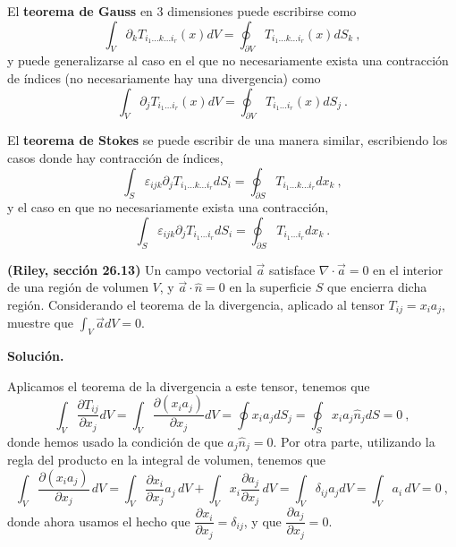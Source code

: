 El \textbf{teorema de Gauss} en 3 dimensiones puede escribirse como
\begin{equation}
    \int_V \partial_k T_{i_1 \dots k \dots i_r}(x) dV = \oint_{\partial V} T_{i_1 \dots k \dots i_r} (x) dS_k \ ,
\end{equation}
y puede generalizarse al caso en el que no necesariamente exista una contracción de índices (no necesariamente hay una divergencia) como
\begin{equation}
    \int_V \partial_j T_{i_1 \dots i_r}(x) dV = \oint_{\partial V} T_{i_1 \dots i_r} (x) dS_j \ .
\end{equation}

El \textbf{teorema de Stokes} se puede escribir de una manera similar, escribiendo los casos donde hay contracción de índices,
\begin{equation}
    \int_S \varepsilon_{ijk} \partial_j T_{i_1 \dots k \dots i_r} dS_i = \oint_{\partial S} T_{i_1 \dots k \dots i_r} dx_k \ ,
\end{equation}
y el caso en que no necesariamente exista una contracción,
\begin{equation}
    \int_S \varepsilon_{ijk} \partial_j T_{i_1 \dots i_r} dS_i = \oint_{\partial S} T_{i_1 \dots i_r} dx_k \ .
\end{equation}

\begin{ejemplo}
    \textbf{(Riley, sección 26.13)} Un campo vectorial $\vec{a}$ satisface $\nabla \cdot \vec{a} = 0$ en el interior de una región de volumen $V$, y $\vec{a} \cdot \hat{n} = 0$ en la superficie $S$ que encierra dicha región. Considerando el teorema de la divergencia, aplicado al tensor $T_{ij} = x_i a_j$, muestre que $\int_V \vec{a} dV = 0$.

    \textbf{Solución.}

    Aplicamos el teorema de la divergencia a este tensor, tenemos que
    \begin{equation*}
        \int_V \frac{\partial T_{ij}}{\partial x_j} dV = \int_V \frac{\partial(x_i a_j)}{\partial x_j} dV = \oint x_i a_j dS_j = \oint_S x_i a_j \hat{n}_j dS = 0 \ ,
    \end{equation*}
    donde hemos usado la condición de que $a_j \hat{n}_j = 0$. Por otra parte, utilizando la regla del producto en la integral de volumen, tenemos que
    \begin{equation*}
        \int_V \frac{\partial(x_i a_j)}{\partial x_j} \, dV = \int_V \frac{\partial x_i}{\partial x_j} a_j \, dV + \int_V x_i \frac{\partial a_j}{\partial x_j} \, dV = \int_V \delta_{ij} a_j dV = \int_V a_i \, dV = 0 \ ,
    \end{equation*}
    donde ahora usamos el hecho que $\dfrac{\partial x_i}{\partial x_j} = \delta_{ij}$, y que $\dfrac{\partial a_j}{\partial x_j} = 0$.
\end{ejemplo}




